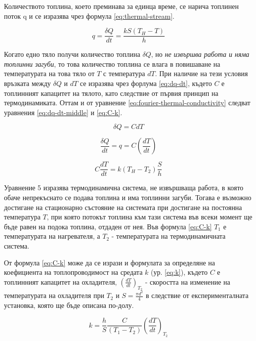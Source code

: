\documentclass[12pt]{article}
\begin{document}
Количеството топлина, което преминава за единца време, се нарича топлинен поток q и се изразява чрез формула \ref{eq:thermal-stream}.

\begin{equation}\label{eq:thermal-stream}
    q = \frac{\delta Q}{dt} = \frac{kS(T_H - T)}{h}
\end{equation}

Когато едно тяло получи количество топлина $\delta Q$, но \textit{не извършва работа и няма топлинни загуби}, то това количество топлина се влага в повишаване на температурата на това тяло от $T$ с температура $dT$. При наличие на тези условия връзката между $\delta Q$ и $dT$ се изразява чрез форлума \ref{eq:dq-dt}, където $C$ е топлинният капацитет на тялото, като следствие от първия принцип на термодинамиката. Оттам и от уравнение \ref{eq:fourier-thermal-conductivity} следват уравнения \ref{eq:dq-dt-middle} и \ref{eq:C-k}.

\begin{equation}\label{eq:dq-dt}
    \delta Q = C dT
\end{equation}

\begin{equation}\label{eq:dq-dt-middle}
    \frac{\delta Q}{dt} = q = C\left(\frac{dT}{dt}\right)
\end{equation}

\begin{equation}\label{eq:C-k}
    C\frac{dT}{dt} = k (T_H - T_2)\frac{S}{h}
\end{equation}


Уравнение 5 изразява термодинамична система, не извършваща работа, в която обаче непрекъснато се подава топлина и има топлинни загуби. Тогава е възможно достигане на стационарно състояние на системата при достигане на постоянна температура $T$, при която потокът топлина към тази система във всеки момент ще бъде равен на подока топлина, отдаден от нея. Във формула \ref{eq:C-k} $T_1$ е температурата на нагревателя, а $T_2$ - температурата на термодинамичната система.

От формула \ref{eq:C-k} може да се изрази и формулата за определяне на коефициента на топлопроводимост на средата $k$ (ур. \ref{eq:k}), където $C$ е топлинният капацитет на охладителя, $\left(\frac{dT}{dt}\right)_{T_2}$ - скоростта на изменение на температурата на охладителя при $T_2$ и $S = \frac{\pi d^2}{4}$ в следствие от експерименталната установка, която ще бъде описана по-долу.

\begin{equation}\label{eq:k}
    k = \frac{h}{S} \frac{C}{(T_1-T_2)} \left(\frac{dT}{dt}\right)_{T_2}
\end{equation}
\end{document}
